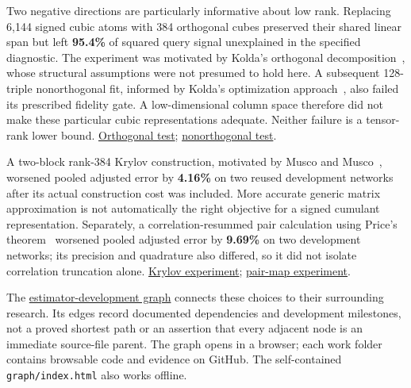 \documentclass[11pt,letterpaper]{article}
\begin{document}
Two negative directions are particularly informative about low rank. Replacing 6,144 signed cubic atoms with 384 orthogonal cubes preserved their shared linear span but left \textbf{95.4\%} of squared query signal unexplained in the specified diagnostic. The experiment was motivated by Kolda's orthogonal decomposition~\cite{ref-kolda-orthogonal}, whose structural assumptions were not presumed to hold here. A subsequent 128-triple nonorthogonal fit, informed by Kolda's optimization approach~\cite{ref-kolda-optimization}, also failed its prescribed fidelity gate. A low-dimensional column space therefore did not make these particular cubic representations adequate. Neither failure is a tensor-rank lower bound. \href{https://github.com/mattliston/arc-whitebox-estimation-challenge/tree/main/experiments/third-order-planes/replacing-6144-signed-atoms-384-orthogonal-cubes-leaves-query/}{Orthogonal test}; \href{https://github.com/mattliston/arc-whitebox-estimation-challenge/tree/main/experiments/third-order-planes/nonorthogonal-rank128-symmetric-cubic-triplet-merge-layer-8-leaves/}{nonorthogonal test}.

A two-block rank-384 Krylov construction, motivated by Musco and Musco~\cite{ref-musco}, worsened pooled adjusted error by \textbf{4.16\%} on two reused development networks after its actual construction cost was included. More accurate generic matrix approximation is not automatically the right objective for a signed cumulant representation. Separately, a correlation-resummed pair calculation using Price's theorem~\cite{ref-price} worsened pooled adjusted error by \textbf{9.69\%} on two development networks; its precision and quadrature also differed, so it did not isolate correlation truncation alone. \href{https://github.com/mattliston/arc-whitebox-estimation-challenge/tree/main/experiments/third-order-planes/two-block-rank384-krylov-basis-raises-pooled-adjusted-error/}{Krylov experiment}; \href{https://github.com/mattliston/arc-whitebox-estimation-challenge/tree/main/experiments/series-expansions/correlation-resummed-pair-consumer-32-node-gaussian-integral-fp64/}{pair-map experiment}.

The \href{https://mattliston.github.io/arc-whitebox-estimation-challenge/\#node=dev-signed-pair-state&view=map}{estimator-development graph} connects these choices to their surrounding research. Its edges record documented dependencies and development milestones, not a proved shortest path or an assertion that every adjacent node is an immediate source-file parent. The graph opens in a browser; each work folder contains browsable code and evidence on GitHub. The self-contained \texttt{graph/index.html} also works offline.
\end{document}
